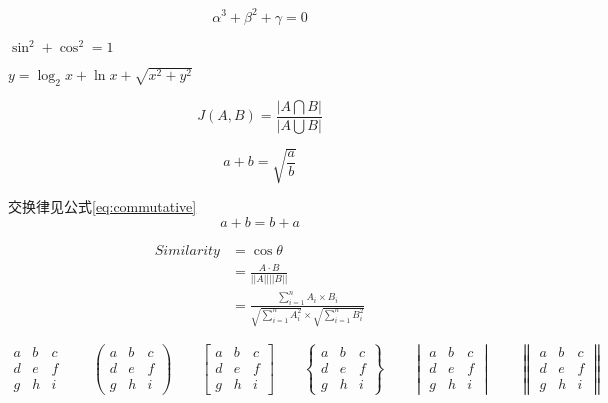 \documentclass{article}
\begin{document}
	
	\[
		\alpha^3 + \beta^2 + \gamma = 0
	\]
	
	$\sin^2 + \cos^2 = 1$
	
	$y = \log_2 x + \ln x + \sqrt{x^2+y^2}$

	
	\begin{equation}
		J(A,B) = \frac{|A \bigcap B|}{|A \bigcup B|} \label{eq}
	\end{equation}
	
	\begin{equation}
		a+b=\sqrt{\frac{a}{b}}\label{eq}
	\end{equation}
	
	交换律见公式\ref{eq:commutative}
	\begin{equation}
		a+b=b+a \label{eq:commutative}
	\end{equation}
	
	\begin{equation}
		\begin{aligned}
		Similarity &= \cos \theta\\
		&= \frac{A·B}{||A|| ||B||}\\
		&= \frac{\sum_{i=1}^{n}A_i \times B_i}{\sqrt{\sum_{i=1}^{n}A_i^2} \times \sqrt{\sum_{i=1}^{n}B_i^2}}
		\end{aligned}
		\label{eq}
	\end{equation}
	
	
	\[
	\begin{matrix}
		a & b & c \\
		d & e & f \\
		g & h & i
	\end{matrix} \qquad
	\begin{pmatrix}
	a & b & c \\
	d & e & f \\
	g & h & i
	\end{pmatrix} \qquad
	\begin{bmatrix}
	a & b & c \\
	d & e & f \\
	g & h & i
	\end{bmatrix} \qquad
	\begin{Bmatrix}
	a & b & c \\
	d & e & f \\
	g & h & i
	\end{Bmatrix}  \qquad
	\begin{vmatrix}
	a & b & c \\
	d & e & f \\
	g & h & i
	\end{vmatrix}  \qquad
	\begin{Vmatrix}
	a & b & c \\
	d & e & f \\
	g & h & i
	\end{Vmatrix}  \qquad
	\]
	
\end{document}
